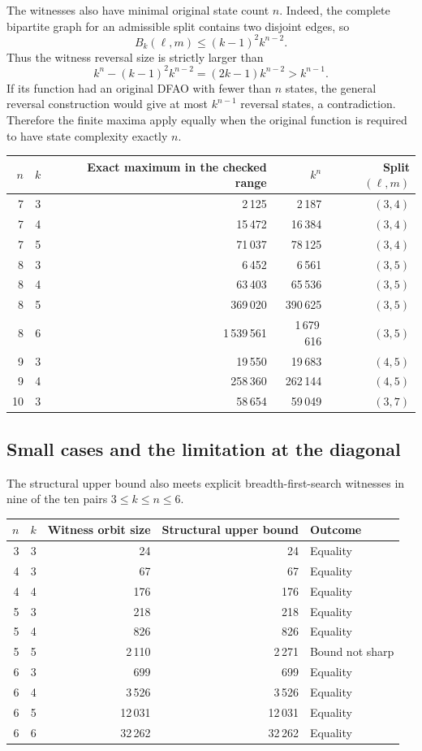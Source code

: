 \documentclass[11pt,a4paper]{article}
\numberwithin{equation}{section}
\theoremstyle{definition}
\theoremstyle{remark}
\begin{document}
The witnesses also have minimal original state count $n$. Indeed, the
complete bipartite graph for an admissible split contains two disjoint
edges, so
\[
 B_k(\ell,m)\le(k-1)^2k^{n-2}.
\]
Thus the witness reversal size is strictly larger than
\[
 k^n-(k-1)^2k^{n-2}=(2k-1)k^{n-2}>k^{n-1}.
\]
If its function had an original DFAO with fewer than $n$ states, the general
reversal construction would give at most $k^{n-1}$ reversal states, a
contradiction. Therefore the finite maxima apply equally when the original
function is required to have state complexity exactly $n$.

\begin{center}
\begin{tabular}{@{}rrrrr@{}}
\toprule
$n$ & $k$ & Exact maximum in the checked range & $k^n$ & Split $(\ell,m)$\\
\midrule
7 & 3 & 2\,125 & 2\,187 & $(3,4)$\\
7 & 4 & 15\,472 & 16\,384 & $(3,4)$\\
7 & 5 & 71\,037 & 78\,125 & $(3,4)$\\
8 & 3 & 6\,452 & 6\,561 & $(3,5)$\\
8 & 4 & 63\,403 & 65\,536 & $(3,5)$\\
8 & 5 & 369\,020 & 390\,625 & $(3,5)$\\
8 & 6 & 1\,539\,561 & 1\,679\,616 & $(3,5)$\\
9 & 3 & 19\,550 & 19\,683 & $(4,5)$\\
9 & 4 & 258\,360 & 262\,144 & $(4,5)$\\
10 & 3 & 58\,654 & 59\,049 & $(3,7)$\\
\bottomrule
\end{tabular}
\end{center}

\subsection{Small cases and the limitation at the diagonal}

The structural upper bound also meets explicit breadth-first-search
witnesses in nine of the ten pairs $3\le k\le n\le6$.
\begin{center}
\begin{tabular}{@{}rrrrl@{}}
\toprule
$n$ & $k$ & Witness orbit size & Structural upper bound & Outcome\\
\midrule
3 & 3 & 24 & 24 & Equality\\
4 & 3 & 67 & 67 & Equality\\
4 & 4 & 176 & 176 & Equality\\
5 & 3 & 218 & 218 & Equality\\
5 & 4 & 826 & 826 & Equality\\
5 & 5 & 2\,110 & 2\,271 & Bound not sharp\\
6 & 3 & 699 & 699 & Equality\\
6 & 4 & 3\,526 & 3\,526 & Equality\\
6 & 5 & 12\,031 & 12\,031 & Equality\\
6 & 6 & 32\,262 & 32\,262 & Equality\\
\bottomrule
\end{tabular}
\end{center}
\end{document}
